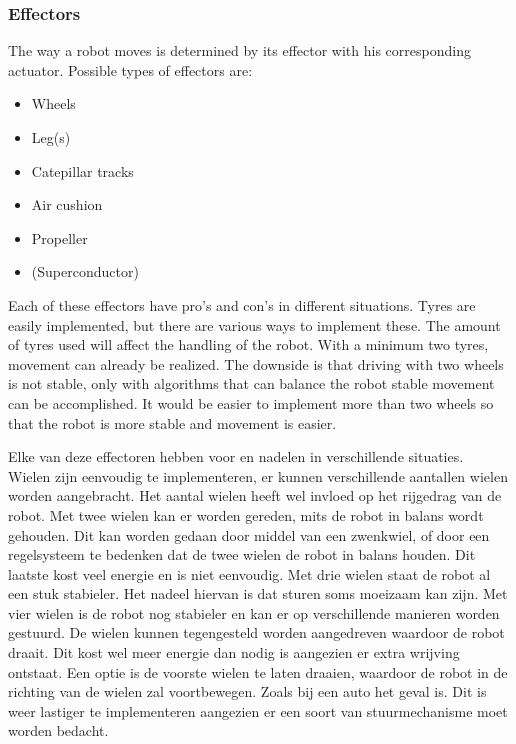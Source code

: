 \documentclass[10pt,a4paper]{article}
\begin{document}
\subsubsection{Effectors}
The way a robot moves is determined by its effector with his corresponding actuator. Possible types of effectors are:


\begin{itemize}
\item Wheels
\item Leg(s)
\item Catepillar tracks
\item Air cushion  
\item Propeller 
\item (Superconductor)
\end{itemize}

Each of these effectors have pro's and con's in different situations. Tyres are easily implemented, but there are various ways to implement these. The amount of tyres used will affect the handling of the robot. With a minimum two tyres, movement can already be realized. The downside is that driving with two wheels is not stable, only with algorithms that can balance the robot stable movement can be accomplished. It would be easier to implement more than two wheels so that the robot is more stable and movement is easier. 


  
Elke van deze effectoren hebben voor en nadelen in verschillende situaties.\\Wielen zijn eenvoudig te implementeren, er kunnen verschillende aantallen wielen worden aangebracht. Het aantal wielen heeft wel invloed op het rijgedrag van de robot. Met twee wielen kan er worden gereden, mits de robot in balans wordt gehouden. Dit kan worden gedaan door middel van een zwenkwiel, of door een regelsysteem te bedenken dat de twee wielen de robot in balans houden. Dit laatste kost veel energie en is niet eenvoudig. Met drie wielen staat de robot al een stuk stabieler. Het nadeel hiervan is dat sturen soms moeizaam kan zijn. Met vier wielen is de robot nog stabieler en kan er op verschillende manieren worden gestuurd. De wielen kunnen tegengesteld worden aangedreven waardoor de robot draait. Dit kost wel meer energie dan nodig is aangezien er extra wrijving ontstaat. Een optie is de voorste wielen te laten draaien, waardoor de robot in de richting van de wielen zal voortbewegen. Zoals bij een auto het geval is. Dit is weer lastiger te implementeren aangezien er een soort van stuurmechanisme moet worden bedacht. 
\end{document}
